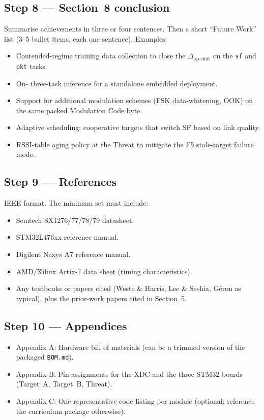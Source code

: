 \documentclass[11pt,letterpaper]{article}
\begin{document}
\subsection{Step 8 --- Section~8 conclusion}
Summarise achievements in three or four sentences. Then a short ``Future Work'' list (3--5 bullet items, each one sentence). Examples:
\begin{itemize}[leftmargin=2em]
	\item Contended-regime training data collection to close the $\Delta_{\text{op-shift}}$ on the \texttt{sf} and \texttt{pkt} tasks.
	\item On-\FPGA{} three-task inference for a standalone embedded deployment.
	\item Support for additional modulation schemes (\mbox{FSK} data-whitening, \mbox{OOK}) on the same packed Modulation Code byte.
	\item Adaptive scheduling: cooperative targets that switch SF based on link quality.
	\item RSSI-table aging policy at the Threat to mitigate the F5 stale-target failure mode.
\end{itemize}

\subsection{Step 9 --- References}
IEEE format. The minimum set must include:
\begin{itemize}[leftmargin=2em]
	\item Semtech SX1276/77/78/79 datasheet.
	\item STM32L476xx reference manual.
	\item Digilent Nexys A7 reference manual.
	\item AMD/Xilinx Artix-7 data sheet (timing characteristics).
	\item Any textbooks or papers cited (Weste \& Harris, Lee \& Seshia, G\'eron as typical), plus the prior-work papers cited in Section~5.
\end{itemize}

\subsection{Step 10 --- Appendices}
\begin{itemize}[leftmargin=2em]
	\item Appendix A: Hardware bill of materials (can be a trimmed version of the packaged \texttt{BOM.md}).
	\item Appendix B: Pin assignments for the \FPGA{} \mbox{XDC} and the three STM32 boards (Target~A, Target~B, Threat).
	\item Appendix C: One representative code listing per module (optional; reference the curriculum package otherwise).
\end{itemize}
\end{document}
